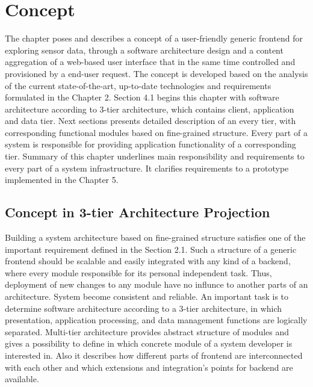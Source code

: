 \chapter{Concept}
     The chapter poses and describes a concept of a user-friendly generic frontend for exploring sensor data, through a software architecture design and a content aggregation of a web-based user interface that in the same time controlled and provisioned by a end-user request. The concept is developed based on the analysis of the current state-of-the-art, up-to-date technologies and requirements formulated in the Chapter 2. 
     \newline
     Section 4.1 begins this chapter with software architecture according to 3-tier architecture, which contains client, application and data tier. Next sections presents detailed description of an every tier, with corresponding functional modules based on fine-grained structure. Every part of a system is responsible for providing application functionality of a corresponding tier. Summary of this chapter underlines main responsibility and requirements to every part of a system infrastructure. It clarifies requirements to a prototype implemented in the Chapter 5.


\section{Concept in 3-tier Architecture Projection}

  Building a system architecture based on fine-grained structure satisfies one of the important requirement defined in the Section 2.1. Such a structure of a generic frontend should be scalable and easily integrated with any kind of a backend, where every module responsible for its personal independent task. Thus, deployment of new changes to any module have no influnce to another parts of an architecture. System become consistent and reliable. An important task is to determine software architecture according to a 3-tier architecture, in which presentation, application processing, and data management functions are logically separated. Multi-tier architecture provides abstract structure of modules and gives a possibility to define in which concrete module of a system developer is interested in. Also it describes how different parts of frontend are interconnected with each other and which extensions and integration's points for backend are available.

